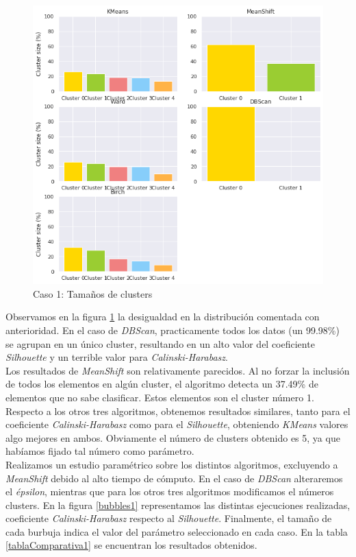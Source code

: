 \documentclass[11pt,a4paper]{article}
\begin{document}
	\begin{figure}[] 
		\centering
		\includegraphics[scale=0.4]{../Caso1/clusters}
		\caption{Caso 1: Tamaños de clusters} \label{clusters1}
	\end{figure}
	
	Observamos en la figura \ref{clusters1} la desigualdad en la distribución comentada con anterioridad. En el caso de \emph{DBScan}, practicamente todos los datos (un 99.98\%) se agrupan en un único cluster, resultando en un alto valor del coeficiente \emph{Silhouette} y un terrible valor para \emph{Calinski-Harabasz}. \\
	
	Los resultados de \emph{MeanShift} son relativamente parecidos. Al no forzar la inclusión de todos los elementos en algún cluster, el algoritmo detecta un 37.49\% de elementos que no sabe clasificar. Estos elementos son el cluster número 1. \\
	
	Respecto a los otros tres algoritmos, obtenemos resultados similares, tanto para el coeficiente \emph{Calinski-Harabasz} como para el \emph{Silhouette}, obteniendo \emph{KMeans} valores algo mejores en ambos. Obviamente el número de clusters obtenido es 5, ya que habíamos fijado tal número como parámetro. \\
	
	Realizamos un estudio paramétrico sobre los distintos algoritmos, excluyendo a \emph{MeanShift} debido al alto tiempo de cómputo. En el caso de \emph{DBScan} alteraremos el \emph{épsilon}, mientras que para los otros tres algoritmos modificamos el números clusters. En la figura \ref{bubbles1} representamos las distintas ejecuciones realizadas, coeficiente \emph{Calinski-Harabasz} respecto al \emph{Silhouette}. Finalmente, el tamaño de cada burbuja indica el valor del parámetro seleccionado en cada caso. En la tabla \ref{tablaComparativa1} se encuentran los resultados obtenidos. \\
	
\end{document}
